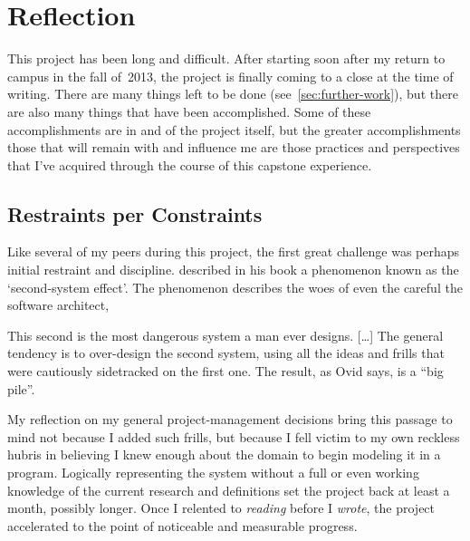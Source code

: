 \section{Reflection}
\label{sec:reflection}

This project has been long and difficult.
After starting soon after my return to campus in the fall of~2013,
  the project is finally coming to a close at the time of writing.
There are many things left to be done (see~\autoref{sec:further-work}),
  but there are also many things that have been accomplished.
Some of these accomplishments are in and of the project itself,
  but the greater accomplishments \Dash
  those that will remain with and influence me \Dash
  are those practices and perspectives that I've acquired
  through the course of this capstone experience.

\subsection{Restraints per Constraints}

Like several of my peers during this project,
  the first great challenge was perhaps initial restraint and discipline.
\citeauthor{brooks:mythical-man-month} described in his book 
  a phenomenon known as the \enquote*{second-system effect}.
The phenomenon describes the woes of even the careful the software architect,
\begin{displayquote}
  This second is the most dangerous system a man ever designs.
  [\dots]
  The general tendency is to over-design the second system,
    using all the ideas and frills that were cautiously sidetracked on the first one.
  The result, as Ovid says, is a \enquote{big pile}.
\end{displayquote}
My reflection on my general project-management decisions bring this passage to mind
  not because I added such frills, but because I fell victim to my own reckless hubris
  in believing I knew enough about the domain to begin modeling it in a program.
Logically representing the system without a full \Dash or even working \Dash
  knowledge of the current research and definitions set the project back at least a month, possibly longer.
Once I relented to \emph{reading} before I \emph{wrote},
  the project accelerated to the point of noticeable and measurable progress.

